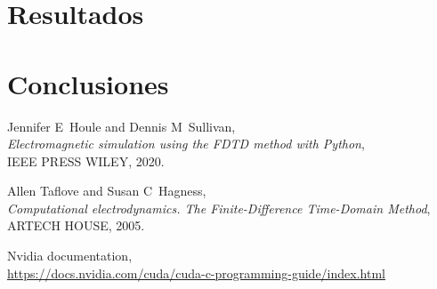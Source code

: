 \documentclass[11pt,a4paper,twoside,pdf]{article}
\numberwithin{equation}{section}
\begin{document}
\section{Resultados}

\newpage




\section{Conclusiones}



\newpage


\begin{thebibliography}{100}

  Jennifer E~Houle and Dennis M~Sullivan, \\
  {\em Electromagnetic simulation using the FDTD method with Python}, \\
  IEEE PRESS WILEY, 2020.
  
Allen Taflove and Susan C~Hagness, \\
{\em Computational electrodynamics. The Finite-Difference Time-Domain Method}, \\
ARTECH HOUSE, 2005.

 Nvidia documentation, \\
 \href{https://docs.nvidia.com/cuda/cuda-c-programming-guide/index.html}{https://docs.nvidia.com/cuda/cuda-c-programming-guide/index.html}





 
\end{thebibliography}
\end{document}
